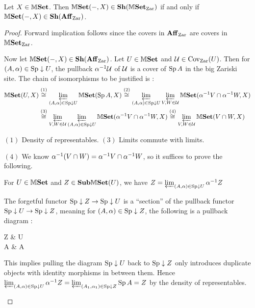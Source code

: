 \documentclass[../main.tex]{subfiles}
\begin{document}
\begin{prop}
  
  Let $X \in \mathbb{M}\mathbf{Set}$.
  Then $\mathbb{M}\mathbf{Set}(-,X) \in \mathbf{Sh}(\mathbb{M}\mathbf{Set}_{\mathrm{Zar}})$ if and only if 
  $\mathbb{M}\mathbf{Set}(-,X) \in \mathbf{Sh}(\mathbf{Aff}_{\mathrm{Zar}})$.
\end{prop}
\begin{proof}
  Forward implication follows since 
  the covers in $\mathbf{Aff}_{\mathrm{Zar}}$ are covers in $\mathbb{M}\mathbf{Set}_{\mathrm{Zar}}$.

  Now let $\mathbb{M}\mathbf{Set}(-,X) \in \mathbf{Sh}(\mathbf{Aff}_{\mathrm{Zar}})$.
  Let $U \in \mathbb{M}\mathbf{Set}$ and $\mathcal{U} \in \operatorname{Cov}_{\mathrm{Zar}}(U)$.
  Then for $(A,\alpha) \in \operatorname{Sp} \downarrow U$, 
  the pullback $\alpha^{-1}\mathcal{U}$ of $\mathcal{U}$ is a cover of $\operatorname{Sp} A$ in the 
  big Zariski site. 
  The chain of isomorphisms to be justified is : 
  \begin{align*}
    \mathbb{M}\mathbf{Set}(U,X) 
    &\overset{(1)}{\cong_{}} \varprojlim_{(A,\alpha) \in \operatorname{Sp}\downarrow U} \mathbb{M}\mathbf{Set}(\operatorname{Sp} A,X)
    \overset{(2)}{\cong_{}} \varprojlim_{(A,\alpha) \in \operatorname{Sp}\downarrow U} \varprojlim_{V,W \in \mathcal{U}} 
      \mathbb{M}\mathbf{Set}(\alpha^{-1} V \cap \alpha^{-1} W, X) \\
    &\overset{(3)}{\cong_{}} \varprojlim_{V,W \in \mathcal{U}} \varprojlim_{(A,\alpha) \in \operatorname{Sp}\downarrow U} 
    \mathbb{M}\mathbf{Set}(\alpha^{-1} V \cap \alpha^{-1} W, X)
    \overset{(4)}{\cong_{}} \varprojlim_{V,W \in \mathcal{U}} \mathbb{M}\mathbf{Set}(V\cap W, X)
  \end{align*}
  
  $(1)$ Density of representables. $(3)$ Limits commute with limits.

  $(4)$ We know $\alpha^{-1} (V \cap W) = \alpha^{-1} V \cap \alpha^{-1} W$,
  so it suffices to prove the following. 
  \begin{lem}
    For $U \in \mathbb{M}\mathbf{Set}$ and $Z \in \mathbf{Sub}\mathbb{M}\mathbf{Set}(U)$, we have $
      Z = \varprojlim_{(A,\alpha) \in \operatorname{Sp}\downarrow U} \alpha^{-1} Z
    $
  \end{lem}
  \begin{proof1}
    The forgetful functor $\operatorname{Sp}\downarrow Z \to \operatorname{Sp}\downarrow U$
    is a ``section'' of the pullback functor $\operatorname{Sp}\downarrow U \to \operatorname{Sp}\downarrow Z$,
    meaning for $(A,\alpha) \in \operatorname{Sp}\downarrow Z$, 
    the following is a pullback diagram : 
    \begin{cd}
      Z \ar[r] & U \\
      \SP A \ar[u,"\al"] \ar[r,"\id{}"] & \SP A \ar[u]
    \end{cd}
    This implies pulling the diagram $\operatorname{Sp}\downarrow U$ back to $\operatorname{Sp}\downarrow Z$
    only introduces duplicate objects with identity morphisms in between them.
    Hence $\varprojlim_{(A,\alpha) \in \operatorname{Sp}\downarrow U} \alpha^{-1} Z = 
    \varprojlim_{(A_1,\alpha_1) \in \operatorname{Sp}\downarrow Z} \operatorname{Sp} A = Z$ by 
    the density of representables. 
  \end{proof1}


\end{proof}
\end{document}

